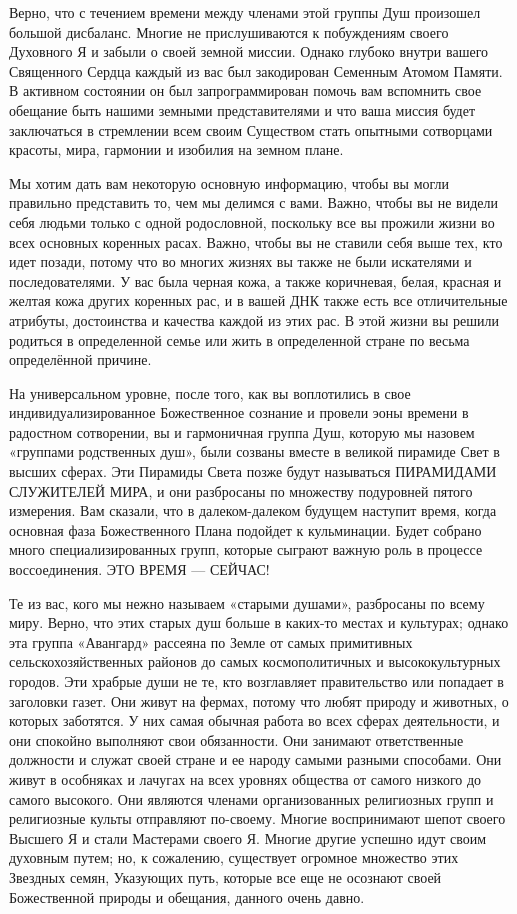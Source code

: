 Верно, что с течением времени между членами этой группы Душ произошел большой
дисбаланс. Многие не прислушиваются к побуждениям своего Духовного Я и забыли о
своей земной миссии. Однако глубоко внутри вашего Священного Сердца каждый из
вас был закодирован Семенным Атомом Памяти. В активном состоянии он был
запрограммирован помочь вам вспомнить свое обещание быть нашими земными
представителями и что ваша миссия будет заключаться в стремлении всем своим
Существом стать опытными сотворцами красоты, мира, гармонии и изобилия на
земном плане.

Мы хотим дать вам некоторую основную информацию, чтобы вы могли правильно
представить то, чем мы делимся с вами. Важно, чтобы вы не видели себя людьми
только с одной родословной, поскольку все вы прожили жизни во всех основных
коренных расах. Важно, чтобы вы не ставили себя выше тех, кто идет позади,
потому что во многих жизнях вы также не были искателями и последователями. У
вас была черная кожа, а также коричневая, белая, красная и желтая кожа других
коренных рас, и в вашей ДНК также есть все отличительные атрибуты, достоинства
и качества каждой из этих рас. В этой жизни вы решили родиться в определенной
семье или жить в определенной стране по весьма определённой причине.

На универсальном уровне, после того, как вы воплотились в свое
индивидуализированное Божественное сознание и провели эоны времени в радостном
сотворении, вы и гармоничная группа Душ, которую мы назовем «группами
родственных душ», были созваны вместе в великой пирамиде Свет в высших сферах.
Эти Пирамиды Света позже будут называться ПИРАМИДАМИ СЛУЖИТЕЛЕЙ МИРА, и они
разбросаны по множеству подуровней пятого измерения. Вам сказали, что в
далеком-далеком будущем наступит время, когда основная фаза Божественного Плана
подойдет к кульминации. Будет собрано много специализированных групп, которые
сыграют важную роль в процессе воссоединения. ЭТО ВРЕМЯ — СЕЙЧАС!

Те из вас, кого мы нежно называем «старыми душами», разбросаны по всему миру.
Верно, что этих старых душ больше в каких-то местах и культурах; однако эта
группа «Авангард» рассеяна по Земле от самых примитивных сельскохозяйственных
районов до самых космополитичных и высококультурных городов. Эти храбрые души
не те, кто возглавляет правительство или попадает в заголовки газет.  Они живут
на фермах, потому что любят природу и животных, о которых заботятся. У них
самая обычная работа во всех сферах деятельности, и они спокойно выполняют свои
обязанности.  Они занимают ответственные должности и служат своей стране и ее
народу самыми разными способами.  Они живут в особняках и лачугах на всех
уровнях общества от самого низкого до самого высокого.  Они являются членами
организованных религиозных групп и религиозные культы отправляют по-своему.
Многие воспринимают шепот своего Высшего Я и стали Мастерами своего Я.  Многие
другие успешно идут своим духовным путем; но, к сожалению, существует огромное
множество этих Звездных семян, Указующих путь, которые все еще не осознают
своей Божественной природы и обещания, данного очень давно.

